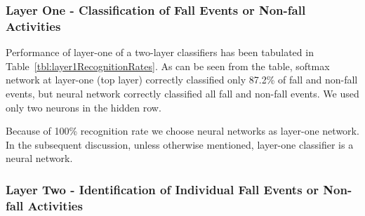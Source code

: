 \documentclass{IEEEtran}
\begin{document}
\subsubsection{Layer One - Classification of Fall Events or Non-fall Activities }
\label{sec:LayerOneFallAndNonFallIdentification}

Performance of layer-one of a two-layer classifiers has been tabulated in Table~\ref{tbl:layer1RecognitionRates}. As can be seen from the table, softmax network at layer-one (top layer) correctly classified only 87.2\% of fall and non-fall events, but neural network correctly classified all fall and non-fall events. We used only two neurons in the hidden row.
\par
 Because of  100\% recognition rate we choose neural networks as layer-one network. In the subsequent discussion, unless otherwise mentioned,  layer-one classifier is a neural network.

%

\subsubsection{Layer Two - Identification of Individual Fall Events or Non-fall 
Activities}
\label{sec:LayerTwoFallOrNonFallEventIdentification}
\end{document}
